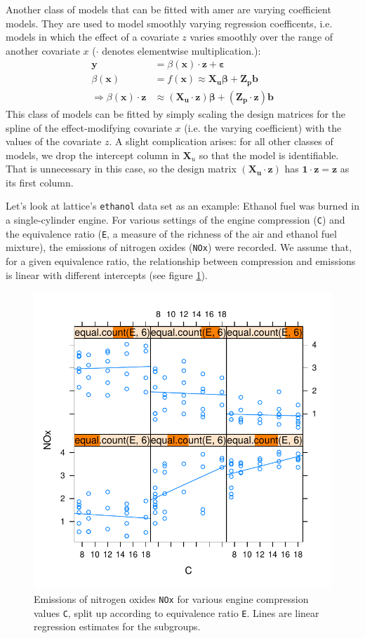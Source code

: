 \documentclass[12pt]{article}
\newcommand{\code}[1]{\texttt{\small{#1}}}
\newcommand{\package}[1]{\textsf{\small{#1}}}
\newcommand{\eps}{\varepsilon}
\begin{document}
Another class of models that can be fitted with \package{amer} are
varying coefficient models. They are used to model smoothly varying
regression coefficents, i.e. models in which the effect of a
covariate $z$ varies smoothly over the range of another covariate
$x$ ($\cdot$ denotes elementwise multiplication.):
\begin{align*}
\bm y &= \beta(\bm x) \cdot \bm z + \bm\eps \\
\beta(\bm x) &= f(\bm x) \approx \bm{X_u \beta +Z_p b} \\
\Rightarrow \beta(\bm x) \cdot \bm z &\approx \bm{(X_u \cdot z)\beta
+ (Z_p \cdot z) b}
\end{align*}
This class
of models can be fitted by simply scaling the design matrices for
the spline of the effect-modifying covariate $x$ (i.e. the varying
coefficient) with the values of the covariate $z$. A slight
complication arises: for all other classes of models, we drop the
intercept column in $\bm X_u$ so that the model is identifiable.
That is unnecessary in this case, so the design matrix $\bm{(X_u
\cdot z)}$ has $\bm{1 \cdot z} = \bm{z}$ as its first column.

Let's look at \package{lattice}'s \code{ethanol} data set as an example: Ethanol
fuel was burned in a single-cylinder engine. For various settings of the engine
compression (\code C) and the equivalence ratio (\code E, a measure of the
richness of the air and ethanol fuel mixture), the emissions of nitrogen oxides
(\code{NOx}) were recorded.  We assume that, for a given equivalence ratio, the
relationship between compression and emissions is linear with different
intercepts (see figure \ref{ethanolPlot}).
\begin{figure}[!htbp] \centering
\includegraphics{GAMMsUsingLME4-ethanolPlot}
\caption{
Emissions of nitrogen oxides \code{NOx}  for various engine compression values
\code C, split up according to equivalence ratio \code E. Lines are linear
regression estimates for the subgroups.
\label{ethanolPlot}}                    
\end{figure}
\end{document}
